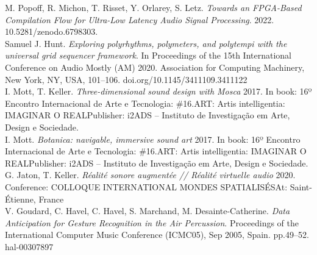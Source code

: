 \documentclass[journal,onecolumn]{IEEEtran}
\begin{document}
\begin{thebibliography}{1}
M. Popoff, R. Michon, T. Risset, Y. Orlarey, S. Letz. \emph{Towards an FPGA-Based Compilation Flow for Ultra-Low Latency Audio Signal Processing}. 2022. 10.5281/zenodo.6798303. \\

Samuel J. Hunt. \emph{Exploring polyrhythms, polymeters, and polytempi with the universal grid sequencer framework}. In Proceedings of the 15th International Conference on Audio Mostly (AM) 2020. Association for Computing Machinery, New York, NY, USA, 101–106. doi.org/10.1145/3411109.3411122 \\

I. Mott, T. Keller. \emph{Three-dimensional sound design with Mosca} 
2017. In book: 16º Encontro Internacional de Arte e Tecnologia: \#16.ART: Artis intelligentia: IMAGINAR O REALPublisher: i2ADS – Instituto de Investigação em Arte, Design e Sociedade. \\

I. Mott. \emph{Botanica: navigable, immersive sound art} 
2017. In book: 16º Encontro Internacional de Arte e Tecnologia: \#16.ART: Artis intelligentia: IMAGINAR O REALPublisher: i2ADS – Instituto de Investigação em Arte, Design e Sociedade. \\

G. Jaton, T. Keller. \emph{Réalité sonore augmentée // Réalité virtuelle audio} 2020. Conference: COLLOQUE INTERNATIONAL MONDES SPATIALISÉSAt: Saint-Étienne, France \\

V. Goudard, C. Havel, C. Havel, S. Marchand, M. Desainte-Catherine. \emph{Data Anticipation for Gesture Recognition in the Air Percussion}. Proceedings of the International Computer Music Conference (ICMC05), Sep 2005, Spain. pp.49–52. hal-00307897 \\

\end{thebibliography}

% 
\end{document}
